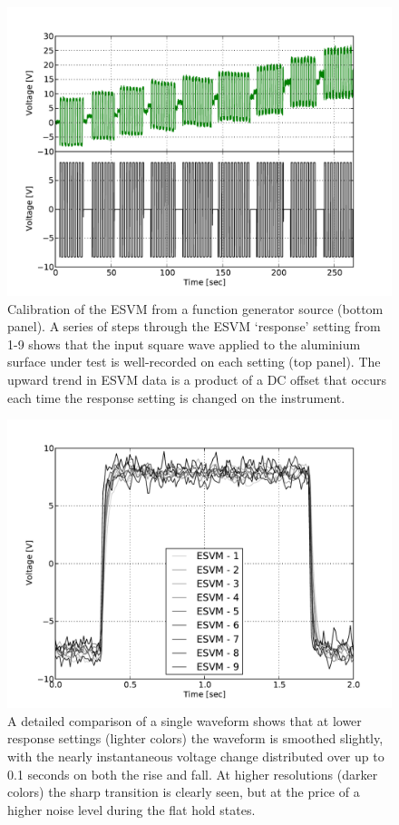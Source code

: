 \begin{figure}
\includegraphics[width=30pc]{chap_electrical/ESVM_Calibration.pdf}
\caption{Calibration of the ESVM from a function generator source (bottom panel).  A series of steps through the ESVM `response' setting from 1-9 shows that the input square wave applied to the aluminium surface under test is well-recorded on each setting (top panel).  The upward trend in ESVM data is a product of a DC offset that occurs each time the response setting is changed on the instrument.}
\label{esvm_calibration}
\end{figure}

\begin{figure}
\includegraphics[width=30pc]{chap_electrical/ESVM_Calibration_Pulse.pdf}
\caption{A detailed comparison of a single waveform shows that at lower response settings (lighter colors) the waveform is smoothed slightly, with the nearly instantaneous voltage change distributed over up to 0.1 seconds on both the rise and fall.  At higher resolutions (darker colors) the sharp transition is clearly seen, but at the price of a higher noise level during the flat hold states.}
\label{esvm_response}
\end{figure}

